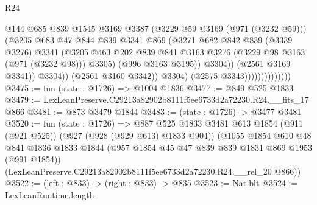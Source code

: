 \begin{lexlean}{R24}
\begin{coremodule}
                                          @144
                                          @685
                                          @839
                                          @1545
                                          @3169
                                          @3387
                                          (@3229 @59 @3169 (@971 (@3232 @59)))
                                          (@3205
                                            @683
                                            @47
                                            @844
                                            @839
                                            @3341
                                            @869
                                            (@3271
                                              @682
                                              @842
                                              @839
                                              (@3339 @3276)
                                              @3341
                                              (@3205
                                                @463
                                                @202
                                                @839
                                                @841
                                                @3163
                                                @3276
                                                (@3229 @98 @3163 (@971 (@3232 @98)))
                                                @3305)
                                              (@996 @3163 @3195))
                                            @3304))
                                        (@2561 @3169 @3341))
                                      @3304))
                                  (@2561 @3160 @3342))
                                @3304)
                              (@2575 @3343))))))))))))))
@3475 := fun (state : @1726) => @1004 @1836
@3477 := @849 @525 @1833
@3479 := LexLeanPreserve.C29213a82902b8111f5ee6733d2a72230.R24.__fits_17 @866
@3481 := @873 @3479 @1844
@3483 := (state : @1726) -> @3477 @3481
@3520 := fun (state : @1726) =>
  @887
    @525
    @1833
    @3481
    @613
    @1854
    (@911 (@921 @525))
    (@927 (@928 (@929 @613) @1833 @904))
    (@1055
      @1854
      @610
      @48
      @841
      @1836
      @1833
      @1844
      (@957 @1854 @45 @47 @839 @839 @1831 @869 @1953 (@991 @1854))
      (LexLeanPreserve.C29213a82902b8111f5ee6733d2a72230.R24.__rel_20 @866))
@3522 := (left : @833) -> (right : @833) -> @835
@3523 := Nat.blt
@3524 := LexLeanRuntime.length

\end{coremodule}
\end{lexlean}
